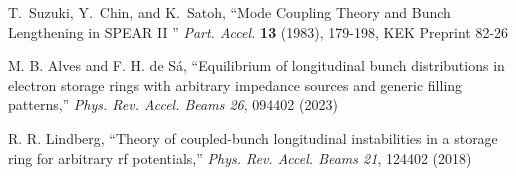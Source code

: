 \documentclass
[
    a4paper,
    biblatex,     %
]{jacow}
\begin{document}
{\begin{thebibliography}{9}
    T.~Suzuki, Y.~Chin, and K.~Satoh,
    \textquotedblleft Mode Coupling Theory and Bunch Lengthening in {SPEAR} {II} \textquotedblright
    \emph{Part. Accel.} \textbf{13} (1983), 179-198,
    KEK Preprint 82-26

    M. B. Alves and F. H. de S\'a,
    ``Equilibrium of longitudinal bunch distributions in electron storage rings with arbitrary impedance sources and generic filling patterns,''
    \emph{Phys. Rev. Accel. Beams 26}, 094402 (2023)

    R. R. Lindberg,
    ``Theory of coupled-bunch longitudinal instabilities in a storage ring for arbitrary rf potentials,''
    \emph{Phys. Rev. Accel. Beams 21}, 124402 (2018)
	\end{thebibliography}
} %
\end{document}
